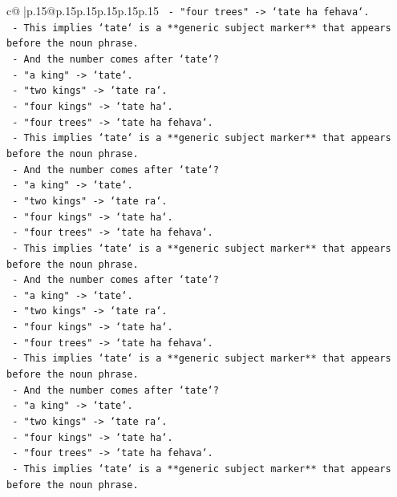 \documentclass{article}
\begin{document}
{\begin{supertabular}{c@{$\;$}|p{.15\linewidth}@{}p{.15\linewidth}p{.15\linewidth}p{.15\linewidth}p{.15\linewidth}p{.15\linewidth}}
{{{\texttt{    {-} "four trees" {-}> `tate ha fehava`.} \\
\texttt{    {-} This implies `tate` is a **generic subject marker** that appears before the noun phrase.} \\
\texttt{    {-} And the number comes after `tate`?} \\
\texttt{    {-} "a king" {-}> `tate`.} \\
\texttt{    {-} "two kings" {-}> `tate ra`.} \\
\texttt{    {-} "four kings" {-}> `tate ha`.} \\
\texttt{    {-} "four trees" {-}> `tate ha fehava`.} \\
\texttt{    {-} This implies `tate` is a **generic subject marker** that appears before the noun phrase.} \\
\texttt{    {-} And the number comes after `tate`?} \\
\texttt{    {-} "a king" {-}> `tate`.} \\
\texttt{    {-} "two kings" {-}> `tate ra`.} \\
\texttt{    {-} "four kings" {-}> `tate ha`.} \\
\texttt{    {-} "four trees" {-}> `tate ha fehava`.} \\
\texttt{    {-} This implies `tate` is a **generic subject marker** that appears before the noun phrase.} \\
\texttt{    {-} And the number comes after `tate`?} \\
\texttt{    {-} "a king" {-}> `tate`.} \\
\texttt{    {-} "two kings" {-}> `tate ra`.} \\
\texttt{    {-} "four kings" {-}> `tate ha`.} \\
\texttt{    {-} "four trees" {-}> `tate ha fehava`.} \\
\texttt{    {-} This implies `tate` is a **generic subject marker** that appears before the noun phrase.} \\
\texttt{    {-} And the number comes after `tate`?} \\
\texttt{    {-} "a king" {-}> `tate`.} \\
\texttt{    {-} "two kings" {-}> `tate ra`.} \\
\texttt{    {-} "four kings" {-}> `tate ha`.} \\
\texttt{    {-} "four trees" {-}> `tate ha fehava`.} \\
\texttt{    {-} This implies `tate` is a **generic subject marker** that appears before the noun phrase.} \\
}}}
\end{supertabular}}
\end{document}
